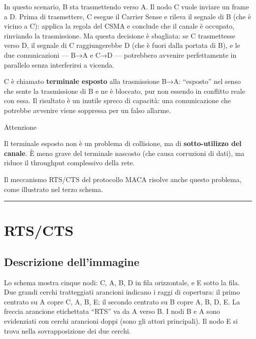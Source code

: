 \documentclass[
  italian,
  openany]{book}
\begin{document}
In questo scenario, B sta trasmettendo verso A. Il nodo C vuole inviare
un frame a D. Prima di trasmettere, C esegue il Carrier Sense e rileva
il segnale di B (che è vicino a C): applica la regola del CSMA e
conclude che il canale è occupato, rinviando la trasmissione. Ma questa
decisione è sbagliata: se C trasmettesse verso D, il segnale di C
raggiungerebbe D (che è fuori dalla portata di B), e le due
comunicazioni --- B→A e C→D --- potrebbero avvenire perfettamente in
parallelo senza interferirsi a vicenda.

C è chiamato \textbf{terminale esposto} alla trasmissione B→A:
``esposto'' nel senso che sente la trasmissione di B e ne è bloccato,
pur non essendo in conflitto reale con essa. Il risultato è un inutile
spreco di capacità: una comunicazione che potrebbe avvenire viene
soppressa per un falso allarme.

\begin{calloutwarning}{Attenzione}

Il terminale esposto non è un problema di collisione, ma di
\textbf{sotto-utilizzo del canale}. È meno grave del terminale nascosto
(che causa corruzioni di dati), ma riduce il throughput complessivo
della rete.

\end{calloutwarning}

Il meccanismo RTS/CTS del protocollo MACA risolve anche questo problema,
come illustrato nel terzo schema.

\begin{center}\rule{0.5\linewidth}{0.5pt}\end{center}

\section{RTS/CTS}\label{rtscts}

\subsection{Descrizione dell'immagine}\label{descrizione-dellimmagine-2}

Lo schema mostra cinque nodi: C, A, B, D in fila orizzontale, e E sotto
la fila. Due grandi cerchi tratteggiati arancioni indicano i raggi di
copertura: il primo centrato su A copre C, A, B, E; il secondo centrato
su B copre A, B, D, E. La freccia arancione etichettata ``RTS'' va da A
verso B. I nodi B e A sono evidenziati con cerchi arancioni doppi (sono
gli attori principali). Il nodo E si trova nella sovrapposizione dei due
cerchi.
\end{document}
